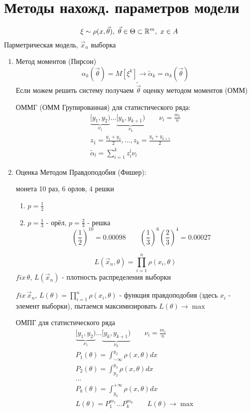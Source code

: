 \documentclass{article}
\begin{document}
\section{Методы нахожд. параметров модели}
\[
  \xi\sim \rho(x,\vec{\theta}), \ \vec{\theta}\in\Theta \subset \R^{m}, \ x\in A
\]
Парметрическая модель, $\vec{x}_n$ выборка
\begin{enumerate}
  \item Метод моментов (Пирсон)
    \[
      \alpha_k(\vec{\theta})=M[\xi^{k}] \rightarrow \tilde{\alpha}_k=\alpha_k(\vec{\theta})
    \]
    Если можем решить систему получаем $\tilde{\vec{\theta}}$ оценку методом моментов (ОММ)


    \begin{remark}
    ОММГ (ОММ Групированная) для статистического ряда:
    \begin{gather*}
      \underbrace{[y_1,y_2)}_{\nu_1}\dots \underbrace{[y_k,y_{k+1})}_{\nu_k} \qquad \nu_i=\frac{m_i}{n} \\ 
      z_1=\frac{y_1+y_2}{2},\dots ,z_k=\frac{y_k+y_{k+1}}{2} \\ 
      \tilde{\alpha}_l=\sum_{i=1}^{k}z_i^{l}\nu_i
    \end{gather*}
    \end{remark}
  \item Оценка Методом Правдоподобия (Фишер):

    \hr 
    монета 10 раз, 6 орлов, 4 решки
    \begin{enumerate}
      \item $p=\frac{1}{2}$
      \item $p=\frac{1}{3}$ - орёл, $p=\frac{2}{3}$ - решка
        \[
          \left(\frac{1}{2}\right)^{10}=0.0 0 098 \qquad \left(\frac{1}{3}\right)^{6}\left(\frac{2}{3}\right)^{4}=0.0 0 027
        \]
    \end{enumerate}
    \hr
    \[
      L(\vec{x}_n,\theta)=\prod_{i=1}^{n}\rho(x_i,\theta)
    \]
    $fix \, \theta$, $L(\vec{x}_n)$ - плотность распределения выборки

    $fix \, \vec{x}_n$, $L(\theta)=\prod_{i=1}^{n}\rho(x_i, \theta)$ - функция правдоподобия
    (здесь $x_i$ - элемент выборки), пытаемся максимизировать $L(\theta)\to\max$
    \begin{remark}
      ОМПГ для статистического ряда 
      \begin{gather*}
        \underbrace{[y_1,y_2)}_{\nu_1}\dots \underbrace{[y_k,y_{k+1})}_{\nu_k} \qquad \nu_i=\frac{m_i}{n} \\ 
        P_1(\theta)=\int_{-\infty}^{y_2}\rho(x,\theta)dx \\
        P_2(\theta)=\int_{y_2}^{y_3}\rho(x,\theta)dx \\
        \dots \\
        P_k(\theta)=\int_{y_k}^{+\infty}\rho(x,\theta)dx \\
        L(\theta)=P_1^{m_1}\dots P_k^{m_k} \qquad L(\theta)\to\max
      \end{gather*}
    \end{remark}

\end{enumerate}
\end{document}
